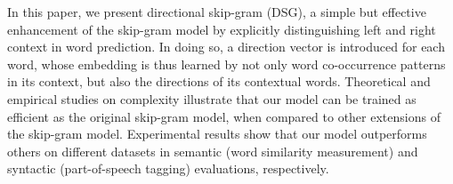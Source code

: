 In this paper, we present directional skip-gram (DSG), a simple but effective enhancement of the skip-gram model by explicitly distinguishing left and right context in word prediction. In doing so, a direction vector is introduced for each word, whose embedding is thus learned by not only word co-occurrence patterns in its context, but also the directions of its contextual words. Theoretical and empirical studies on complexity illustrate that our model can be trained as efficient as the original skip-gram model, when compared to other extensions of the skip-gram model. Experimental results show that our model outperforms others on different datasets in semantic (word similarity measurement) and syntactic (part-of-speech tagging) evaluations, respectively.
